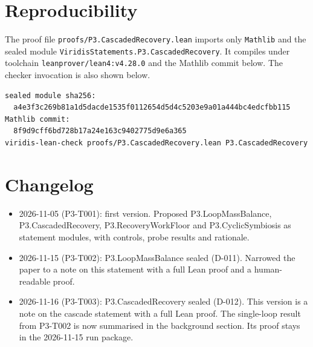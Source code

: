 \documentclass[11pt]{article}
\theoremstyle{definition}
\theoremstyle{remark}
\begin{document}
\section{Reproducibility}
\sloppy
The proof file \texttt{proofs/P3.CascadedRecovery.lean} imports only \texttt{Mathlib} and the
sealed module \texttt{ViridisStatements.P3.CascadedRecovery}. It compiles under toolchain
\texttt{leanprover/lean4:v4.28.0} and the Mathlib commit below. The checker invocation is also
shown below.
\begin{lstlisting}[language={},frame=none]
sealed module sha256:
  a4e3f3c269b81a1d5dacde1535f0112654d5d4c5203e9a01a444bc4edcfbb115
Mathlib commit:
  8f9d9cff6bd728b17a24e163c9402775d9e6a365
viridis-lean-check proofs/P3.CascadedRecovery.lean P3.CascadedRecovery
\end{lstlisting}

\section{Changelog}
\begin{itemize}
\item 2026-11-05 (P3-T001): first version. Proposed P3.LoopMassBalance, P3.CascadedRecovery,
P3.RecoveryWorkFloor and P3.CyclicSymbiosis as statement modules, with controls, probe results
and rationale.
\item 2026-11-15 (P3-T002): P3.LoopMassBalance sealed (D-011). Narrowed the paper to a note on
this statement with a full Lean proof and a human-readable proof.
\item 2026-11-16 (P3-T003): P3.CascadedRecovery sealed (D-012). This version is a note on the
cascade statement with a full Lean proof. The single-loop result from P3-T002 is now summarised
in the background section. Its proof stays in the 2026-11-15 run package.
\end{itemize}



\end{document}
